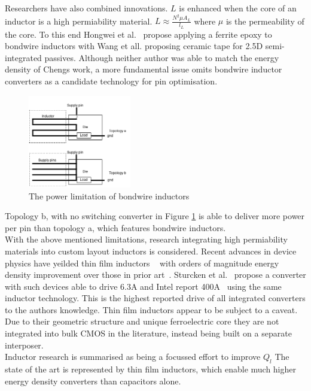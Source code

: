 \documentclass[letterpaper,twocolumn,10pt]{article}
\begin{document}
\indent Researchers have also combined innovations. $L$ is enhanced when the core of an inductor is a high permiability material. $L \approx \frac{N^2\mu A_L}{l_L}$ where $\mu$ is the permeability of the core. To this end Hongwei et al.~\cite{Hongwei2011} propose applying a ferrite epoxy to bondwire inductors with Wang et all. proposing ceramic tape for 2.5D semi-integrated passives. Although neither author was able to match the energy density of Chengs work, a more fundamental issue omits bondwire inductor converters as a candidate technology for pin optimisation.
    
\begin{figure}[here]
\includegraphics[width=0.4\textwidth]{CostvsGainofBondWireInductor}
\caption{The power limitation of bondwire inductors}
\label{BondWireLim}
\end{figure}

Topology b, with no switching converter in Figure \ref{BondWireLim} is able to deliver more power per pin than topology a, which features bondwire inductors.\\
\indent With the above mentioned limitations, research integrating high permiability materials into custom layout inductors is considered. Recent advances in device physics have yeilded thin film inductors ~\cite{OSulivan2013} with orders of magnitude energy density improvement over those in prior art~\cite{Meere2009}. Sturcken et al.~\cite{Sturcken2013} propose a converter with such devices able to drive 6.3A and Intel report 400A~\cite{Intel2010} using the same inductor technology. This is the highest reported drive of all integrated converters to the authors knowledge. Thin film inductors appear to be subject to a caveat. Due to their geometric structure and unique ferroelectric core they are not integrated into bulk CMOS in the literature, instead being built on a separate interposer.\\
\indent Inductor research is summarised as being a focussed effort to improve $Q_l$ The state of the art is represented by thin film inductors, which enable much higher energy density converters than capacitors alone.\\
\end{document}
